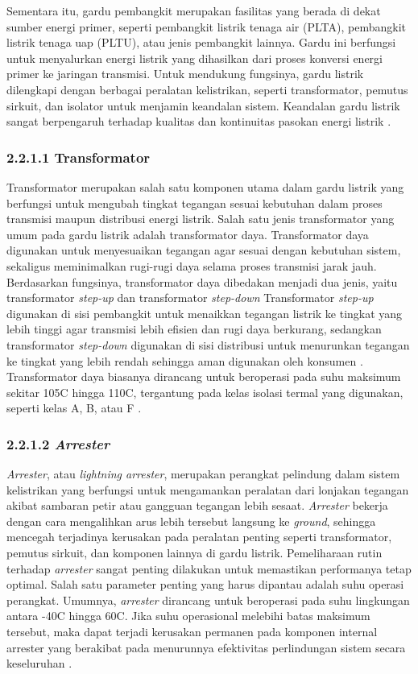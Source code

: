 Sementara itu, gardu pembangkit merupakan fasilitas yang berada di dekat sumber energi primer, seperti pembangkit listrik tenaga air (PLTA), pembangkit listrik tenaga uap (PLTU), atau jenis pembangkit lainnya. Gardu ini berfungsi untuk menyalurkan energi listrik yang dihasilkan dari proses konversi energi primer ke jaringan transmisi. Untuk mendukung fungsinya, gardu listrik dilengkapi dengan berbagai peralatan kelistrikan, seperti transformator, pemutus sirkuit, dan isolator untuk menjamin keandalan sistem. Keandalan gardu listrik sangat berpengaruh terhadap kualitas dan kontinuitas pasokan energi listrik \cite{gonen2016electric}.

\subsubsection{2.2.1.1 Transformator}
Transformator merupakan salah satu komponen utama dalam gardu listrik yang berfungsi untuk mengubah tingkat tegangan sesuai kebutuhan dalam proses transmisi maupun distribusi energi listrik. Salah satu jenis transformator yang umum pada gardu listrik adalah transformator daya. Transformator daya digunakan untuk menyesuaikan tegangan agar sesuai dengan kebutuhan sistem, sekaligus meminimalkan rugi-rugi daya selama proses transmisi jarak jauh. Berdasarkan fungsinya, transformator daya dibedakan menjadi dua jenis, yaitu transformator \emph{step-up} dan transformator \emph{step-down}  Transformator \emph{step-up} digunakan di sisi pembangkit untuk menaikkan tegangan listrik ke tingkat yang lebih tinggi agar transmisi lebih efisien dan rugi daya berkurang, sedangkan transformator \emph{step-down} digunakan di sisi distribusi untuk menurunkan tegangan ke tingkat yang lebih rendah sehingga aman digunakan oleh konsumen . Transformator daya biasanya dirancang untuk beroperasi pada suhu maksimum sekitar 105\textdegree{}C hingga 110\textdegree{}C, tergantung pada kelas isolasi termal yang digunakan, seperti kelas A, B, atau F \cite{stevenson1994power}.

\subsubsection{2.2.1.2 \emph{Arrester}}
\emph{Arrester}, atau \emph{lightning arrester}, merupakan perangkat pelindung dalam sistem kelistrikan yang berfungsi untuk mengamankan peralatan dari lonjakan tegangan akibat sambaran petir atau gangguan tegangan lebih sesaat. \emph{Arrester} bekerja dengan cara mengalihkan arus lebih tersebut langsung ke \emph{ground}, sehingga mencegah terjadinya kerusakan pada peralatan penting seperti transformator, pemutus sirkuit, dan komponen lainnya di gardu listrik. Pemeliharaan rutin terhadap \emph{arrester} sangat penting dilakukan untuk memastikan performanya tetap optimal. Salah satu parameter penting yang harus dipantau adalah suhu operasi perangkat. Umumnya, \emph{arrester} dirancang untuk beroperasi pada suhu lingkungan antara -40\textdegree{}C hingga 60\textdegree{}C. Jika suhu operasional melebihi batas maksimum tersebut, maka dapat terjadi kerusakan permanen pada komponen internal arrester yang berakibat pada menurunnya efektivitas perlindungan sistem secara keseluruhan \cite{Kartika2022}.

